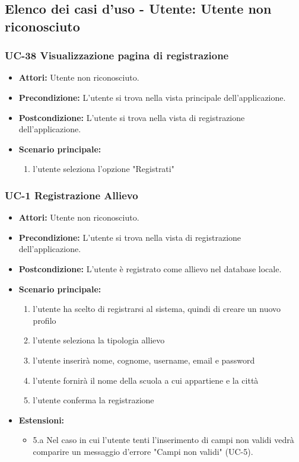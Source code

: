 \subsection{Elenco dei casi d'uso - Utente: Utente non riconosciuto}

\subsubsection{UC-38 Visualizzazione pagina di registrazione}
	\begin{itemize}
		\item \textbf{Attori:} Utente non riconosciuto.
		\item \textbf{Precondizione:} L'utente si trova nella vista principale dell'applicazione.
		\item \textbf{Postcondizione:} L'utente si trova nella vista di registrazione dell'applicazione.
		\item \textbf{Scenario principale:}
		\begin{enumerate}
			\item l'utente seleziona l'opzione "Registrati"
		\end{enumerate}
	\end{itemize}


\subsubsection{UC-1 Registrazione Allievo}
\begin{itemize}
		\item \textbf{Attori: }Utente non riconosciuto.
		\item \textbf{Precondizione: }L'utente si trova nella vista di registrazione dell'applicazione.
		\item \textbf{Postcondizione: }L'utente è registrato come allievo nel database locale.
		\item \textbf{Scenario principale: }
		\begin{enumerate}
		\item l'utente ha scelto di registrarsi al sistema, quindi di creare un nuovo profilo
		\item l'utente seleziona la tipologia allievo
		\item l'utente inserirà nome, cognome, username, email e password
		\item l'utente fornirà il nome della scuola a cui appartiene e la città
		\item l'utente conferma la registrazione
		\end{enumerate}
		\item \textbf{Estensioni: }
		\begin{itemize}
			\item 5.a Nel caso in cui l'utente tenti l'inserimento di campi non validi vedrà comparire un messaggio d'errore "Campi non validi" (UC-5).
		\end{itemize}
\end{itemize}

